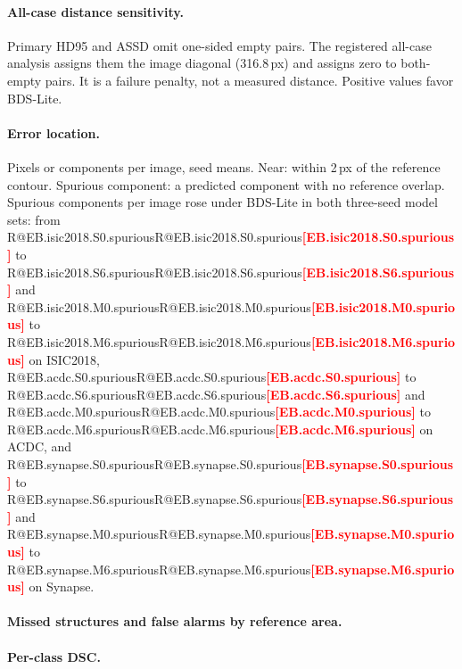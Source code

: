 \documentclass[10pt]{article}
\makeatletter
\newcommand{\R}[1]{\ifcsname R@#1\endcsname\csname R@#1\endcsname\else\textbf{\textcolor{red}{[#1]}}\fi}
\makeatother
\begin{document}
\paragraph{All-case distance sensitivity.} Primary HD95 and ASSD omit one-sided empty pairs. The registered all-case analysis assigns them the image diagonal (316.8\,px) and assigns zero to both-empty pairs. It is a failure penalty, not a measured distance. Positive values favor BDS-Lite.
\begin{table}[ht]\centering\small

\caption{Primary and all-case distance differences, BDS-Lite versus U-Net. Source: \texttt{revision/tables/families/all\_case\_sensitivity.csv}.}
\end{table}

\paragraph{Error location.} Pixels or components per image, seed means. Near: within 2\,px of the reference contour. Spurious component: a predicted component with no reference overlap. Spurious components per image rose under BDS-Lite in both three-seed model sets: from \R{EB.isic2018.S0.spurious} to \R{EB.isic2018.S6.spurious} and \R{EB.isic2018.M0.spurious} to \R{EB.isic2018.M6.spurious} on ISIC2018, \R{EB.acdc.S0.spurious} to \R{EB.acdc.S6.spurious} and \R{EB.acdc.M0.spurious} to \R{EB.acdc.M6.spurious} on ACDC, and \R{EB.synapse.S0.spurious} to \R{EB.synapse.S6.spurious} and \R{EB.synapse.M0.spurious} to \R{EB.synapse.M6.spurious} on Synapse.
{\small}

\paragraph{Missed structures and false alarms by reference area.}
{\small}

\paragraph{Per-class DSC.}
{\small}

\clearpage
\end{document}
